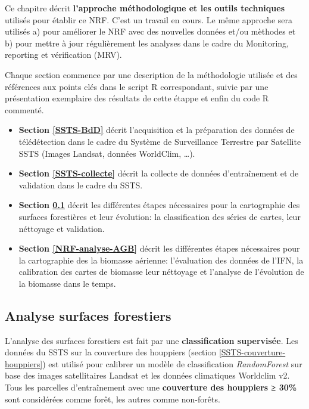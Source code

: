 \documentclass[a4paper, notitlepage, 12pt, krantz2]{krantz}
\providecommand{\tightlist}{%
  \setlength{\itemsep}{0pt}\setlength{\parskip}{0pt}}
\begin{document}
Ce chapitre décrit \textbf{l'approche méthodologique et les outils techniques} utilisés pour établir ce NRF. C'est un travail en cours. Le même approche sera utilisés a) pour améliorer le NRF avec des nouvelles données et/ou mèthodes et b) pour mettre à jour régulièrement les analyses dans le cadre du Monitoring, reporting et vérification (MRV).

Chaque section commence par une description de la méthodologie utilisée et des références aux points clés dans le script R correspondant, suivie par une présentation exemplaire des résultats de cette étappe et enfin du code R commenté.

\begin{itemize}
\tightlist
\item
  \textbf{Section \ref{SSTS-BdD}} décrit l'acquisition et la préparation des données de télédétection dans le cadre du Système de Surveillance Terrestre par Satellite SSTS (Images Landsat, données WorldClim, \ldots{}).
\item
  \textbf{Section \ref{SSTS-collecte}} décrit la collecte de données d'entraînement et de validation dans le cadre du SSTS.
\item
  \textbf{Section \ref{NRF-analyse-MCF}} décrit les différentes étapes nécessaires pour la cartographie des surfaces forestières et leur évolution: la classification des séries de cartes, leur néttoyage et validation.
\item
  \textbf{Section \ref{NRF-analyse-AGB}} décrit les différentes étapes nécessaires pour la cartographie des la biomasse aérienne: l'évaluation des données de l'IFN, la calibration des cartes de biomasse leur néttoyage et l'analyse de l'évolution de la biomasse dans le temps.
\end{itemize}

\hypertarget{NRF-analyse-MCF}{%
\subsection{Analyse surfaces forestiers}\label{NRF-analyse-MCF}}

L'analyse des surfaces forestiers est fait par une \textbf{classification supervisée}. Les données du SSTS sur la couverture des houppiers (section \ref{SSTS-couverture-houppiers}) est utilisé pour calibrer un modèle de classification \emph{RandomForest} sur base des images satellitaires Landsat et les données climatiques Worldclim v2. Tous les parcelles d'entraînement avec une \textbf{couverture des houppiers ≥ 30\%} sont considérées comme forêt, les autres comme non-forêts.
\end{document}
